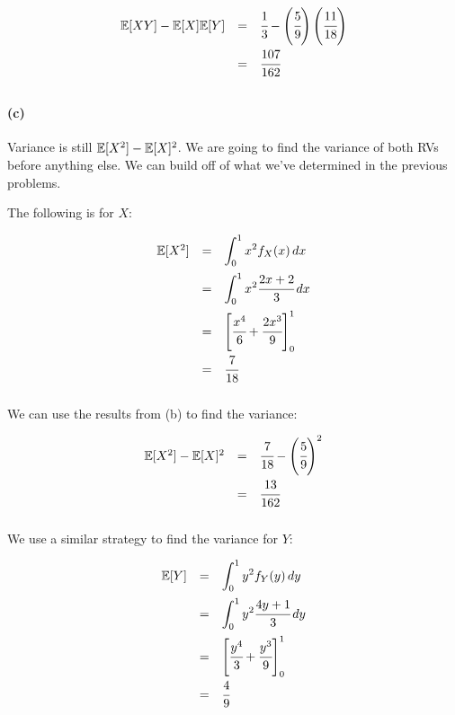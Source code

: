 \documentclass[a4paper]{article}
\begin{document}
\begin{equation}
\begin{array}{rll}
\mathbb{E}[XY] - \mathbb{E}[X]\mathbb{E}[Y] & = & \cfrac{1}{3} - \left( \cfrac{5}{9} \right) \left( \cfrac{11}{18} \right) \\[.15in]
& = & \cfrac{107}{162} \\[.15in]
\end{array}
\end{equation}

\paragraph{(c)}

Variance is still $\mathbb{E}[X^2]-\mathbb{E}[X]^2$. We are going to find the variance of both RVs before anything else. We can build off of what we've determined in the previous problems.

The following is for $X$:

\begin{equation}
\begin{array}{rll}
\mathbb{E}[X^2] & = & \displaystyle\int^1_{0} x^2 f_X(x) \,dx \\[.15in]
& = & \displaystyle\int^1_{0} x^2 \cfrac{2x+2}{3} \,dx \\[.15in]
& = & \left[ \cfrac{x^4}{6} + \cfrac{2x^3}{9} \right]^1_0 \\[.15in]
& = & \cfrac{7}{18} \\[.15in]
\end{array}
\end{equation}

We can use the results from (b) to find the variance:

\begin{equation}
\begin{array}{rll}
\mathbb{E}[X^2] - \mathbb{E}[X]^2 & = & \cfrac{7}{18} - \left( \cfrac{5}{9} \right)^2 \\[.15in]
& = & \cfrac{13}{162} \\[.15in]
\end{array}
\end{equation}

We use a similar strategy to find the variance for $Y$:


\begin{equation}
\begin{array}{rll}
\mathbb{E}[Y] & = & \displaystyle\int^1_{0} y^2 f_Y(y) \,dy \\[.15in]
& = & \displaystyle\int^1_{0} y^2 \cfrac{4y+1}{3} \,dy \\[.15in]
& = & \left[ \cfrac{y^4}{3} + \cfrac{y^3}{9} \right]^1_0 \\[.15in]
& = & \cfrac{4}{9} \\[.15in]
\end{array}
\end{equation}
\end{document}
